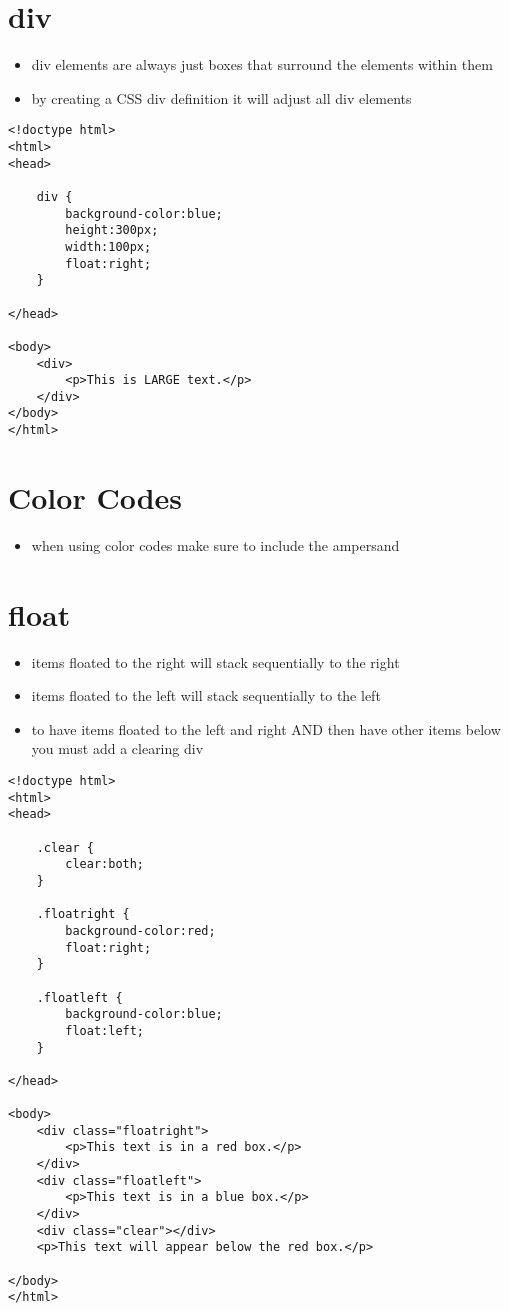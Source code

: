 \documentclass{article}
\begin{document}
\section{div}
\begin{itemize}
  \item div elements are always just boxes that surround the elements within
    them
  \item by creating a CSS div definition it will adjust all div elements
\end{itemize}
\begin{lstlisting}
<!doctype html>
<html>
<head>

    div {
        background-color:blue;
        height:300px;
        width:100px;
        float:right;
    }

</head>

<body>
    <div>
        <p>This is LARGE text.</p>
    </div>
</body>
</html>
\end{lstlisting}

\section{Color Codes}
\begin{itemize}
  \item when using color codes make sure to include the ampersand
\end{itemize}

\section{float}
\begin{itemize}
  \item items floated to the right will stack sequentially to the right
  \item items floated to the left will stack sequentially to the left
  \item to have items floated to the left and right AND then have other items
    below you must add a clearing div
\end{itemize}
\begin{lstlisting}
<!doctype html>
<html>
<head>

    .clear {
        clear:both;
    }

    .floatright {
        background-color:red;
        float:right;
    }

    .floatleft {
        background-color:blue;
        float:left;
    }

</head>

<body>
    <div class="floatright">
        <p>This text is in a red box.</p>
    </div>
    <div class="floatleft">
        <p>This text is in a blue box.</p>
    </div>
    <div class="clear"></div>
    <p>This text will appear below the red box.</p>

</body>
</html>
\end{lstlisting}
\end{document}
